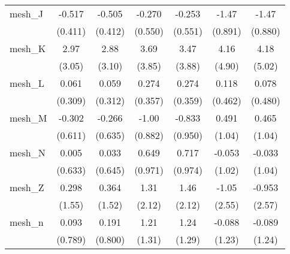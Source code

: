 \begin{tabular}{lcccccc}
   mesh\_J                                                     & -0.517        & -0.505       & -0.270       & -0.253       & -1.47          & -1.47\\   
                                                               & (0.411)       & (0.412)      & (0.550)      & (0.551)      & (0.891)        & (0.880)\\   
   mesh\_K                                                     & 2.97          & 2.88         & 3.69         & 3.47         & 4.16           & 4.18\\   
                                                               & (3.05)        & (3.10)       & (3.85)       & (3.88)       & (4.90)         & (5.02)\\   
   mesh\_L                                                     & 0.061         & 0.059        & 0.274        & 0.274        & 0.118          & 0.078\\   
                                                               & (0.309)       & (0.312)      & (0.357)      & (0.359)      & (0.462)        & (0.480)\\   
   mesh\_M                                                     & -0.302        & -0.266       & -1.00        & -0.833       & 0.491          & 0.465\\   
                                                               & (0.611)       & (0.635)      & (0.882)      & (0.950)      & (1.04)         & (1.04)\\   
   mesh\_N                                                     & 0.005         & 0.033        & 0.649        & 0.717        & -0.053         & -0.033\\   
                                                               & (0.633)       & (0.645)      & (0.971)      & (0.974)      & (1.02)         & (1.04)\\   
   mesh\_Z                                                     & 0.298         & 0.364        & 1.31         & 1.46         & -1.05          & -0.953\\   
                                                               & (1.55)        & (1.52)       & (2.12)       & (2.12)       & (2.55)         & (2.57)\\   
   mesh\_n                                                     & 0.093         & 0.191        & 1.21         & 1.24         & -0.088         & -0.089\\   
                                                               & (0.789)       & (0.800)      & (1.31)       & (1.29)       & (1.23)         & (1.24)\\   

\end{tabular}
